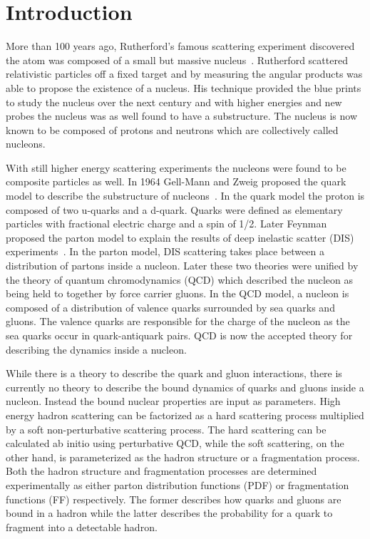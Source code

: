 \chapter{Introduction} \label{ch::intro}

More than 100 years ago, Rutherford's famous scattering experiment discovered
the atom was composed of a small but massive nucleus~\cite{Rutherford:1911zz}.
Rutherford scattered relativistic particles off a fixed target and by measuring
the angular products was able to propose the existence of a nucleus.  His
technique provided the blue prints to study the nucleus over the next century
and with higher energies and new probes the nucleus was as well found to have a
substructure.  The nucleus is now known to be composed of protons
and neutrons which are collectively called nucleons.

With still higher energy scattering experiments the nucleons were found to be
composite particles as well.  In 1964 Gell-Mann and Zweig proposed the quark
model to describe the substructure of
nucleons~\cite{GellMann:1964nj,Zweig:1964jf}.  In the quark model the proton is
composed of two u-quarks and a d-quark.  Quarks were defined as elementary
particles with fractional electric charge and a spin of 1/2.  Later Feynman
proposed the parton model to explain the results of deep inelastic scatter (DIS)
experiments~\cite{PhysRevLett.23.1415}.  In the parton model, DIS scattering
takes place between a distribution of partons inside a nucleon.  Later these two
theories were unified by the theory of quantum chromodynamics (QCD) which
described the nucleon as being held to together by force carrier gluons.  In the
QCD model, a nucleon is composed of a distribution of valence quarks surrounded
by sea quarks and gluons.  The valence quarks are responsible for the charge of
the nucleon as the sea quarks occur in quark-antiquark pairs.  QCD is now the
accepted theory for describing the dynamics inside a nucleon.

While there is a theory to describe the quark and gluon interactions, there is
currently no theory to describe the bound dynamics of quarks and gluons inside a
nucleon.  Instead the bound nuclear properties are input as parameters.  High
energy hadron scattering can be factorized as a hard scattering process
multiplied by a soft non-perturbative scattering process.  The hard scattering
can be calculated ab initio using perturbative QCD, while the soft scattering,
on the other hand, is parameterized as the hadron structure or a fragmentation
process.  Both the hadron structure and fragmentation processes are determined
experimentally as either parton distribution functions (PDF) or fragmentation
functions (FF) respectively.  The former describes how quarks and gluons are
bound in a hadron while the latter describes the probability for a quark to
fragment into a detectable hadron.


